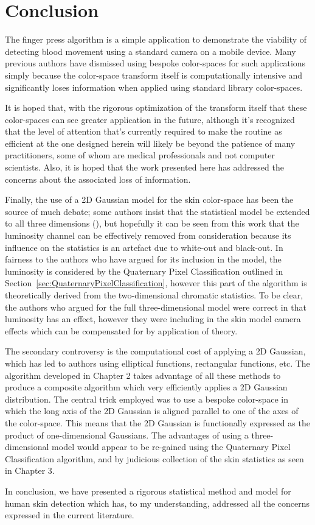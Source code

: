 \section{Conclusion}\label{sec:ConclusionCh5}

The finger press algorithm is a simple application to demonstrate the viability of detecting blood movement using a standard camera on a mobile device. Many previous authors have dismissed using bespoke color-spaces for such applications simply because the color-space transform itself is computationally intensive and significantly loses information when applied using standard library color-spaces.

It is hoped that, with the rigorous optimization of the transform itself  that these color-spaces can see greater application in the future, although it's recognized that the level of attention that's currently required to make the routine as efficient at the one designed herein will likely be beyond the patience of many practitioners, some of whom are medical professionals and not computer scientists. Also, it is hoped that the work presented here has addressed the concerns about the associated loss of information.

Finally, the use of a 2D Gaussian model for the skin color-space has been the source of much debate; some authors insist that the statistical model be extended to all three dimensions (\cite{Shin2002a}), but hopefully it can be seen from this work that the luminosity channel can be effectively removed from consideration because its influence on the statistics is an artefact due to white-out and black-out. In fairness to the authors who have argued for its inclusion in the model, the luminosity is considered by the Quaternary Pixel Classification outlined in Section~\ref{sec:QuaternaryPixelClassification}, however this part of the algorithm is theoretically derived from the two-dimensional chromatic statistics. To be clear, the authors who argued for the full three-dimensional model were correct in that luminosity has an effect, however they were including in the skin model camera effects which can be compensated for by application of theory. 

The secondary controversy is the computational cost of applying a 2D Gaussian, which has led to authors using elliptical functions, rectangular functions, etc. The algorithm developed in Chapter 2 takes advantage of all these methods to produce a composite algorithm which very efficiently applies a 2D Gaussian distribution. The central trick employed was to use a bespoke color-space in which the long axis of the 2D Gaussian is aligned parallel to one of the axes of the color-space. This means that the 2D Gaussian is functionally expressed as the product of one-dimensional Gaussians. The advantages of using a three-dimensional model would appear to be re-gained using the Quaternary Pixel Classification algorithm, and by judicious collection of the skin statistics as seen in Chapter 3. 

In conclusion, we have presented a rigorous statistical method and model for human skin detection which has, to my understanding, addressed all the concerns expressed in the current literature.
